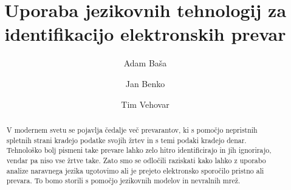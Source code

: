 \documentclass[sigconf,nonacm]{acmart}
\begin{document}
\title{Uporaba jezikovnih tehnologij za identifikacijo elektronskih prevar}


\author{Adam Baša}

\author{Jan Benko}

\author{Tim Vehovar}

\begin{abstract}
   V modernem svetu se pojavlja čedalje več prevarantov, ki s pomočjo nepristnih spletnih strani kradejo podatke svojih žrtev in s temi podaki kradejo denar. Tehnološko bolj pismeni take prevare lahko zelo hitro identificirajo in jih ignorirajo, vendar pa niso vse žrtve take. Zato smo se odločili raziskati kako lahko z uporabo analize naravnega jezika ugotovimo ali je prejeto elektronsko sporočilo pristno ali prevara. To bomo storili s pomočjo jezikovnih modelov in nevralnih mrež. 
\end{abstract}

\end{document}
